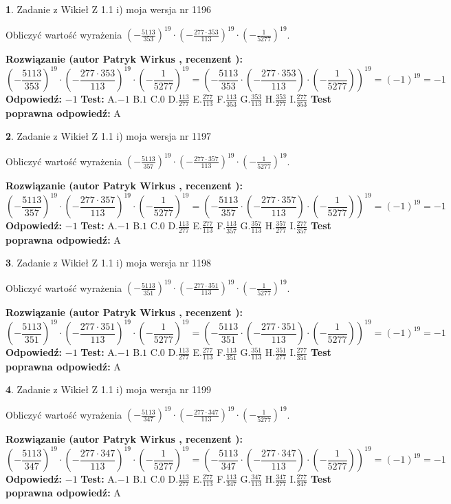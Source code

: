 \documentclass[12pt, a4paper]{article}
\theoremstyle{definition} %
\newtheorem{zad}{}
\newcommand{\zadStart}[1]{\begin{zad}#1\newline}
\newcommand{\zadStop}{\end{zad}}
\newcommand{\rozwStart}[2]{\noindent \textbf{Rozwiązanie (autor #1 , recenzent #2): }\newline}
\newcommand{\rozwStop}{\newline}
\newcommand{\odpStart}{\noindent \textbf{Odpowiedź:}\newline}
\newcommand{\odpStop}{\newline}
\newcommand{\testStart}{\noindent \textbf{Test:}\newline}
\newcommand{\testStop}{\newline}
\newcommand{\kluczStart}{\noindent \textbf{Test poprawna odpowiedź:}\newline}
\newcommand{\kluczStop}{\newline}
\begin{document}
\zadStart{Zadanie z Wikieł Z 1.1 i) moja wersja nr 1196}

Obliczyć wartość wyrażenia $(-\frac{5113}{353})^{19} \cdot (-\frac{277 \cdot 353}{113})^{19} \cdot (-\frac{1}{5277})^{19}$.
\zadStop
\rozwStart{Patryk Wirkus}{}
$$(-\frac{5113}{353})^{19} \cdot (-\frac{277 \cdot 353}{113})^{19} \cdot (-\frac{1}{5277})^{19} = (-\frac{5113}{353} \cdot (-\frac{277 \cdot 353}{113}) \cdot (-\frac{1}{5277}))^{19} = (-1)^{19} = -1$$
\rozwStop
\odpStart
$-1$
\odpStop
\testStart
A.$-1$ B.$1$ C.$0$ D.$\frac{113}{277}$ E.$\frac{277}{113}$
F.$\frac{113}{353}$ G.$\frac{353}{113}$
H.$\frac{353}{277}$
I.$\frac{277}{353}$
\testStop
\kluczStart
A
\kluczStop



\zadStart{Zadanie z Wikieł Z 1.1 i) moja wersja nr 1197}

Obliczyć wartość wyrażenia $(-\frac{5113}{357})^{19} \cdot (-\frac{277 \cdot 357}{113})^{19} \cdot (-\frac{1}{5277})^{19}$.
\zadStop
\rozwStart{Patryk Wirkus}{}
$$(-\frac{5113}{357})^{19} \cdot (-\frac{277 \cdot 357}{113})^{19} \cdot (-\frac{1}{5277})^{19} = (-\frac{5113}{357} \cdot (-\frac{277 \cdot 357}{113}) \cdot (-\frac{1}{5277}))^{19} = (-1)^{19} = -1$$
\rozwStop
\odpStart
$-1$
\odpStop
\testStart
A.$-1$ B.$1$ C.$0$ D.$\frac{113}{277}$ E.$\frac{277}{113}$
F.$\frac{113}{357}$ G.$\frac{357}{113}$
H.$\frac{357}{277}$
I.$\frac{277}{357}$
\testStop
\kluczStart
A
\kluczStop



\zadStart{Zadanie z Wikieł Z 1.1 i) moja wersja nr 1198}

Obliczyć wartość wyrażenia $(-\frac{5113}{351})^{19} \cdot (-\frac{277 \cdot 351}{113})^{19} \cdot (-\frac{1}{5277})^{19}$.
\zadStop
\rozwStart{Patryk Wirkus}{}
$$(-\frac{5113}{351})^{19} \cdot (-\frac{277 \cdot 351}{113})^{19} \cdot (-\frac{1}{5277})^{19} = (-\frac{5113}{351} \cdot (-\frac{277 \cdot 351}{113}) \cdot (-\frac{1}{5277}))^{19} = (-1)^{19} = -1$$
\rozwStop
\odpStart
$-1$
\odpStop
\testStart
A.$-1$ B.$1$ C.$0$ D.$\frac{113}{277}$ E.$\frac{277}{113}$
F.$\frac{113}{351}$ G.$\frac{351}{113}$
H.$\frac{351}{277}$
I.$\frac{277}{351}$
\testStop
\kluczStart
A
\kluczStop



\zadStart{Zadanie z Wikieł Z 1.1 i) moja wersja nr 1199}

Obliczyć wartość wyrażenia $(-\frac{5113}{347})^{19} \cdot (-\frac{277 \cdot 347}{113})^{19} \cdot (-\frac{1}{5277})^{19}$.
\zadStop
\rozwStart{Patryk Wirkus}{}
$$(-\frac{5113}{347})^{19} \cdot (-\frac{277 \cdot 347}{113})^{19} \cdot (-\frac{1}{5277})^{19} = (-\frac{5113}{347} \cdot (-\frac{277 \cdot 347}{113}) \cdot (-\frac{1}{5277}))^{19} = (-1)^{19} = -1$$
\rozwStop
\odpStart
$-1$
\odpStop
\testStart
A.$-1$ B.$1$ C.$0$ D.$\frac{113}{277}$ E.$\frac{277}{113}$
F.$\frac{113}{347}$ G.$\frac{347}{113}$
H.$\frac{347}{277}$
I.$\frac{277}{347}$
\testStop
\kluczStart
A
\kluczStop
\end{document}
